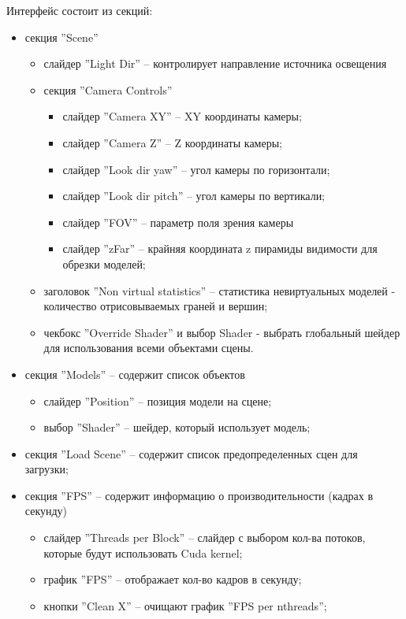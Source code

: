 Интерфейс состоит из секций:
\begin{itemize} 
	\item секция ''Scene''
		 \begin{itemize} 
			\item слайдер ''Light Dir'' -- контролирует направление источника освещения
			\item секция ''Camera Controls''
				\begin{itemize}
					\item слайдер ''Camera XY'' -- XY координаты камеры;
					\item слайдер ''Camera Z'' -- Z координаты камеры;
					\item слайдер ''Look dir yaw'' -- угол камеры по горизонтали;
					\item  слайдер ''Look dir pitch'' -- угол камеры по вертикали;
					\item слайдер ''FOV'' -- параметр поля зрения камеры
					\item слайдер ''zFar'' -- крайняя координата z пирамиды видимости для обрезки моделей;
				\end{itemize}
			\item заголовок ''Non virtual statistics'' -- статистика невиртуальных моделей - количество отрисовываемых граней и вершин;
			\item чекбокс ''Override Shader'' и выбор Shader - выбрать глобальный шейдер для использования всеми объектами сцены.
		 \end{itemize}
	\item секция ''Models'' -- содержит список объектов
		 \begin{itemize}
			\item слайдер ''Position'' -- позиция модели на сцене;
			\item выбор ''Shader'' -- шейдер, который использует модель;
		 \end{itemize}
	\item секция ''Load Scene'' -- содержит список предопределенных сцен для загрузки;
	\item секция ''FPS'' -- содержит информацию о производительности (кадрах в секунду)
		 \begin{itemize}
			\item слайдер ''Threads per Block'' -- слайдер с выбором кол-ва потоков, которые будут использовать Cuda kernel;
			\item график ''FPS'' -- отображает кол-во кадров в секунду;
			\item кнопки ''Clean X'' -- очищают график ''FPS per nthreads'';

\end{itemize}
\end{itemize}
